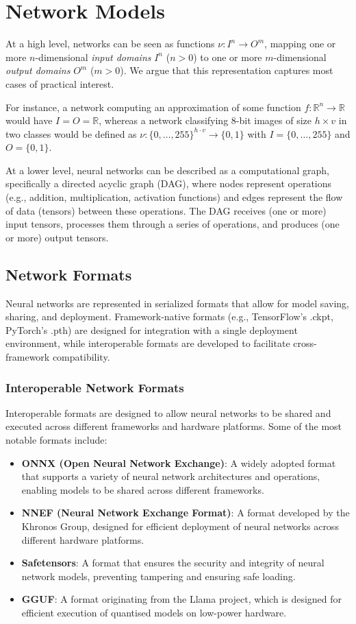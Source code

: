 \chapter{Network Models}
\label{sec:models}
%
At a high level, networks can be seen as functions 
$\nu : I^n \to O^m$, mapping one or more $n$-dimensional \emph{input domains}
$I^n$ ($n > 0$) to one or more $m$-dimensional \emph{output domains} $O^m$ ($m>0$). 
We argue that this representation captures most cases of practical
interest.

For instance, a network computing an approximation
of some function $f: \mathbb{R}^n \to \mathbb{R}$ would have $I = O =
\mathbb{R}$, whereas a network classifying 8-bit images of size $h \times v$ in
two classes would be defined as ${\nu: \{0,\ldots,255\}^{h \cdot v}
\to \{0, 1\}}$ with $I=\{0, \ldots, 255\}$ and $O = \{0,1\}$.

At a lower level, neural networks can be described as a computational graph, specifically a directed acyclic graph (DAG), where nodes represent operations 
(e.g., addition, multiplication, activation functions) and edges represent the flow of data (tensors) between these operations. The DAG receives (one or more) input tensors, 
processes them through a series of operations, and produces (one or more) output tensors.

\section{Network Formats}
\label{sec:model_formats}
Neural networks are represented in serialized formats that allow for model saving, sharing, and deployment. Framework-native formats (e.g., TensorFlow's .ckpt, PyTorch's .pth) are 
designed for integration with a single deployment environment, while interoperable formats are developed to facilitate cross-framework compatibility. 

\subsection{Interoperable Network Formats}
Interoperable formats are designed to allow neural networks to be shared and executed across different frameworks and hardware platforms. Some of the most notable formats include:
\begin{itemize}
	\item \textbf{ONNX (Open Neural Network Exchange)}: A widely adopted format that supports a variety of neural network architectures and operations, enabling models to be shared across different frameworks.
	\item \textbf{NNEF (Neural Network Exchange Format)}: A format developed by the Khronos Group, designed for efficient deployment of neural networks across different hardware platforms.
	\item \textbf{Safetensors}: A format that ensures the security and integrity of neural network models, preventing tampering and ensuring safe loading.
	\item \textbf{GGUF}: A format originating from the Llama project, which is designed for efficient execution of quantised models on low-power hardware. 
\end{itemize}

